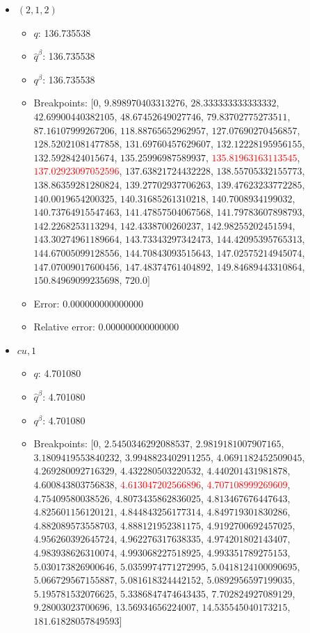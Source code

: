 \documentclass{article}%
\begin{document}
\begin{itemize}
\begin{itemize}
		\item Error: 0.000000000000000%
		\item Relative error: 0.000000000000000%
	\end{itemize}%
	\item $(2, 1, 2)$%
	\begin{itemize}%
		\item $q$: 136.735538%
		\item $\hat{q}^\beta$: 136.735538%
		\item $q^\beta$: 136.735538%
		\item Breakpoints: $[$$0$, $9.898970403313276$, $28.333333333333332$, $42.69900440382105$, $48.67452649027746$, $79.83702775273511$, $87.16107999267206$, $118.88765652962957$, $127.07690270456857$, $128.52021081477858$, $131.69760457629607$, $132.12228195956155$, $132.5928424015674$, $135.25996987589937$, \textcolor{red}{$135.81963163113545$}, \textcolor{red}{$137.02923097052596$}, $137.63821724432228$, $138.55705332155773$, $138.86359281280824$, $139.27702937706263$, $139.47623233772285$, $140.0019654200325$, $140.31685261310218$, $140.7008934199032$, $140.73764915547463$, $141.47857504067568$, $141.79783607898793$, $142.2268253113294$, $142.4338700260237$, $142.98255202451594$, $143.30274961189664$, $143.73343297342473$, $144.42095395765313$, $144.67005099128556$, $144.70843093515643$, $147.02575214945074$, $147.07009017600456$, $147.48374761404892$, $149.84689443310864$, $150.84969099235698$, $720.0$$]$%
		\item Error: 0.000000000000000%
		\item Relative error: 0.000000000000000%
	\end{itemize}%
	\item $\textit{cu},1$%
	\begin{itemize}%
		\item $q$: 4.701080%
		\item $\hat{q}^\beta$: 4.701080%
		\item $q^\beta$: 4.701080%
		\item Breakpoints: $[$$0$, $2.5450346292088537$, $2.9819181007907165$, $3.1809419553840232$, $3.9948823402911255$, $4.0691182452509045$, $4.269280092716329$, $4.432280503220532$, $4.440201431981878$, $4.600843803756838$, \textcolor{red}{$4.613047202566896$}, \textcolor{red}{$4.707108999269609$}, $4.75409580038526$, $4.8073435862836025$, $4.813467676447643$, $4.825601156120121$, $4.844843256177314$, $4.849719301830286$, $4.882089573558703$, $4.888121952381175$, $4.9192700692457025$, $4.956260392645724$, $4.962276317638335$, $4.974201802143407$, $4.983938626310074$, $4.993068227518925$, $4.993351789275153$, $5.030173826900646$, $5.0359974771272995$, $5.0418124100090695$, $5.066729567155887$, $5.081618324442152$, $5.0892956597199035$, $5.195781532076625$, $5.3386847474643435$, $7.702824927089129$, $9.28003023700696$, $13.56934656224007$, $14.535545040173215$, $181.61828057849593$$]$%

\end{itemize}
\end{itemize}
\end{document}
